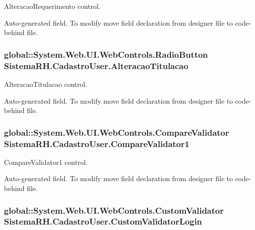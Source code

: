 AlteracaoRequerimento control. 

Auto-\/generated field. To modify move field declaration from designer file to code-\/behind file. \hypertarget{class_sistema_r_h_1_1_cadastro_user_ae60cafd69a6fb8646a6e934bcb01e418}{
\subsubsection[{AlteracaoTitulacao}]{\setlength{\rightskip}{0pt plus 5cm}global::System.Web.UI.WebControls.RadioButton {\bf SistemaRH.CadastroUser.AlteracaoTitulacao}}}
\label{class_sistema_r_h_1_1_cadastro_user_ae60cafd69a6fb8646a6e934bcb01e418}


AlteracaoTitulacao control. 

Auto-\/generated field. To modify move field declaration from designer file to code-\/behind file. \hypertarget{class_sistema_r_h_1_1_cadastro_user_adb506525ca9a486d2a2af45ca2ebfeea}{
\subsubsection[{CompareValidator1}]{\setlength{\rightskip}{0pt plus 5cm}global::System.Web.UI.WebControls.CompareValidator {\bf SistemaRH.CadastroUser.CompareValidator1}}}
\label{class_sistema_r_h_1_1_cadastro_user_adb506525ca9a486d2a2af45ca2ebfeea}


CompareValidator1 control. 

Auto-\/generated field. To modify move field declaration from designer file to code-\/behind file. \hypertarget{class_sistema_r_h_1_1_cadastro_user_a399f5701c728310d19ac0885208f581b}{
\subsubsection[{CustomValidatorLogin}]{\setlength{\rightskip}{0pt plus 5cm}global::System.Web.UI.WebControls.CustomValidator {\bf SistemaRH.CadastroUser.CustomValidatorLogin}}}
\label{class_sistema_r_h_1_1_cadastro_user_a399f5701c728310d19ac0885208f581b}


